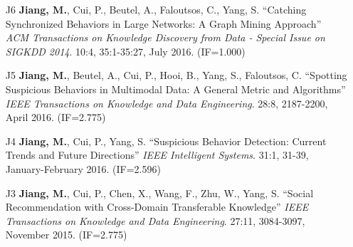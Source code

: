 \documentclass[10pt]{article}
\newenvironment{myindentpar}[1]%
{\begin{list}{}%
         {\setlength{\leftmargin}{#1}}%
         \item[]%
}
{\end{list}}
\newcounter{list}
\newcommand{\hide}[1]{}
\begin{document}
\begin{myindentpar}{0.00cm}
\begin{enumerate}[leftmargin=.5cm]
	\hide{\vspace{-0.1cm}\hspace{0.5cm}{\small \emph{I conceived the idea in consultation with Dr. Faloutsos. I designed the study, completed the experiments, and wrote the paper.}}}

\item[J6] \textbf{Jiang, M.}, Cui, P., Beutel, A., Faloutsos, C., Yang, S. ``Catching Synchronized Behaviors in Large Networks: A Graph Mining Approach'' \textit{ACM Transactions on Knowledge Discovery from Data - Special Issue on SIGKDD 2014}. 10:4, 35:1-35:27, July 2016. (IF=1.000)

	\hide{\vspace{-0.1cm}\hspace{0.5cm}{\small \emph{I conceived the idea in consultation with Dr. Faloutsos. I designed the study, completed the experiments, and wrote the paper.}}}

\item[J5] \textbf{Jiang, M.}, Beutel, A., Cui, P., Hooi, B., Yang, S., Faloutsos, C. ``Spotting Suspicious Behaviors in Multimodal Data: A General Metric and Algorithms'' \textit{IEEE Transactions on Knowledge and Data Engineering}. 28:8, 2187-2200, April 2016. (IF=2.775)

	\hide{\vspace{-0.1cm}\hspace{0.5cm}{\small \emph{I conceived the idea in consultation with Dr. Faloutsos. I designed the study, completed the experiments, and wrote the paper.}}}

\item[J4] \textbf{Jiang, M.}, Cui, P., Yang, S. ``Suspicious Behavior Detection: Current Trends and Future Directions'' \textit{IEEE Intelligent Systems}. 31:1, 31-39, January-February 2016. (IF=2.596)

	\hide{\vspace{-0.1cm}\hspace{0.5cm}{\small \emph{I conceived the idea in consultation with Dr. Cui. I designed the survey and wrote the paper. Dr. Cui edited the paper.}}}

\item[J3] \textbf{Jiang, M.}, Cui, P., Chen, X., Wang, F., Zhu, W., Yang, S. ``Social Recommendation with Cross-Domain Transferable Knowledge'' \textit{IEEE Transactions on Knowledge and Data Engineering}. 27:11, 3084-3097, November 2015. (IF=2.775)

	\hide{\vspace{-0.1cm}\hspace{0.5cm}{\small \emph{I conceived the idea in consultation with Dr. Cui. I designed the study, completed the experiments, and wrote the paper. Mr. Chen helped the experiments.}}}


\end{enumerate}
\end{myindentpar}
\end{document}
